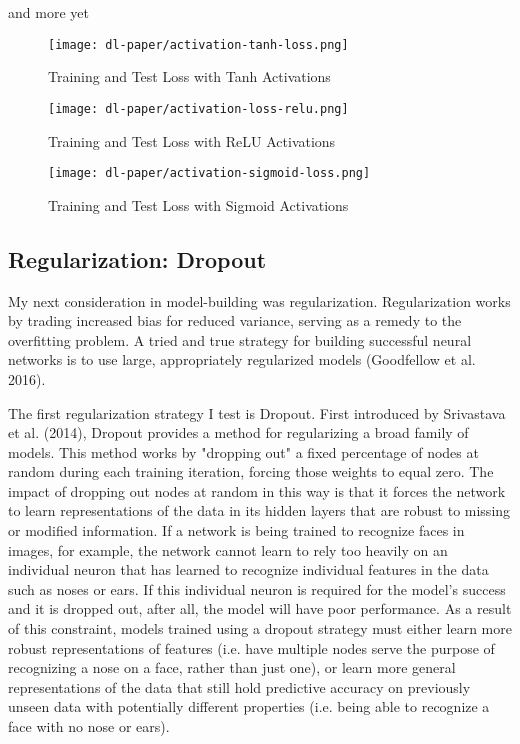 \documentclass[12pt]{article}  %
\theoremstyle{definition}
\theoremstyle{remark}
\begin{document}
\par and more yet 

\begin{figure}[!htb]
  \texttt{[image: dl-paper/activation-tanh-loss.png]}
  \caption{Training and Test Loss with Tanh Activations}\label{tanh}
\endminipage\hfill
{}
  \texttt{[image: dl-paper/activation-loss-relu.png]}
  \caption{Training and Test Loss with ReLU Activations}\label{relu}
\endminipage\hfill
{}%
  \texttt{[image: dl-paper/activation-sigmoid-loss.png]}
  \caption{Training and Test Loss with Sigmoid Activations}\label{sigmoid}
\endminipage
\end{figure}


\subsection{Regularization: Dropout}
\par My next consideration in model-building was regularization. Regularization works by trading increased bias for reduced variance, serving as a remedy to the overfitting problem. A tried and true strategy for building successful neural networks is to use large, appropriately regularized models (Goodfellow et al. 2016). 
\par The first regularization strategy I test is Dropout. First introduced by Srivastava et al. (2014), Dropout provides a method for regularizing a broad family of models. This method works by "dropping out" a fixed percentage of nodes at random during each training iteration, forcing those weights to equal zero. The impact of dropping out nodes at random in this way is that it forces the network to learn representations of the data in its hidden layers that are robust to missing or modified information. If a network is being trained to recognize faces in images, for example, the network cannot learn to rely too heavily on an individual neuron that has learned to recognize individual features in the data such as noses or ears. If this individual neuron is required for the model's success and it is dropped out, after all, the model will have poor performance. As a result of this constraint, models trained using a dropout strategy must either learn more robust representations of features (i.e. have multiple nodes serve the purpose of recognizing a nose on a face, rather than just one), or learn more general representations of the data that still hold predictive accuracy on previously unseen data with potentially different properties (i.e. being able to recognize a face with no nose or ears).  
\end{document}

